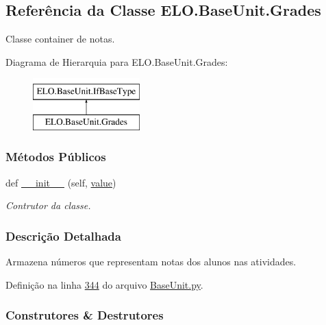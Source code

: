 \hypertarget{classELO_1_1BaseUnit_1_1Grades}{}\subsection{Referência da Classe E\+L\+O.\+Base\+Unit.\+Grades}
\label{classELO_1_1BaseUnit_1_1Grades}


Classe container de notas.  


Diagrama de Hierarquia para E\+L\+O.\+Base\+Unit.\+Grades\+:\begin{figure}[H]
\begin{center}
\leavevmode
\includegraphics[height=2.000000cm]{dc/d3a/classELO_1_1BaseUnit_1_1Grades}
\end{center}
\end{figure}
\subsubsection*{Métodos Públicos}
\begin{DoxyCompactItemize}
\item 
def \hyperlink{classELO_1_1BaseUnit_1_1Grades_acf3b3d08a543e7a8084f8ddd3c577c88}{\+\_\+\+\_\+init\+\_\+\+\_\+} (self, \hyperlink{classELO_1_1BaseUnit_1_1IfBaseType_a2534c3548a8e5991dde0a64b4f0b542b}{value})
\begin{DoxyCompactList}\small\item\em Contrutor da classe. \end{DoxyCompactList}\end{DoxyCompactItemize}


\subsubsection{Descrição Detalhada}
Armazena números que representam notas dos alunos nas atividades. 

Definição na linha \hyperlink{BaseUnit_8py_source_l00344}{344} do arquivo \hyperlink{BaseUnit_8py_source}{Base\+Unit.\+py}.



\subsubsection{Construtores \& Destrutores}
\hypertarget{classELO_1_1BaseUnit_1_1Grades_acf3b3d08a543e7a8084f8ddd3c577c88}{}
